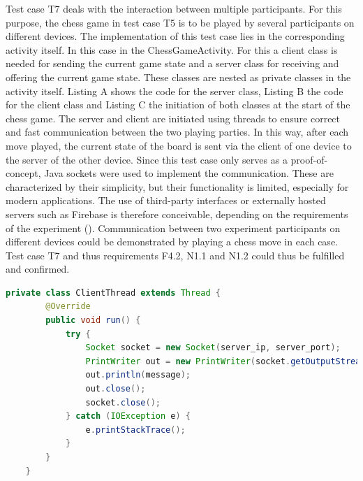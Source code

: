 Test case T7 deals with the interaction between multiple participants. For this purpose, the chess game in test case T5 is to be played by several participants on different devices. The implementation of this test case lies in the corresponding activity itself. In this case in the ChessGameActivity. For this a client class is needed for sending the current game state and a server class for receiving and offering the current game state. These classes are nested as private classes in the activity itself. Listing A shows the code for the server class, Listing B the code for the client class and Listing C the initiation of both classes at the start of the chess game. The server and client are initiated using threads to ensure correct and fast communication between the two playing parties. In this way, after each move played, the current state of the board is sent via the client of one device to the server of the other device. Since this test case only serves as a proof-of-concept, Java sockets were used to implement the communication. These are characterized by their simplicity, but their functionality is limited, especially for modern applications. The use of third-party interfaces or externally hosted servers such as Firebase is therefore conceivable, depending on the requirements of the experiment (\cite{Google.2023b}). Communication between two experiment participants on different devices could be demonstrated by playing a chess move in each case. Test case T7 and thus requirements F4.2, N1.1 and N1.2 could thus be fulfilled and confirmed.


\begin{lstlisting}[language=java,label=t7b,lineskip={0pt}, caption=Collect time needed to conduct experiment (b), basicstyle=\scriptsize, captionpos=b]
    private class ClientThread extends Thread {
        @Override
        public void run() {
            try {
                Socket socket = new Socket(server_ip, server_port);
                PrintWriter out = new PrintWriter(socket.getOutputStream(), true);
                out.println(message);
                out.close();
                socket.close();
            } catch (IOException e) {
                e.printStackTrace();
            }
        }
    }
\end{lstlisting}


